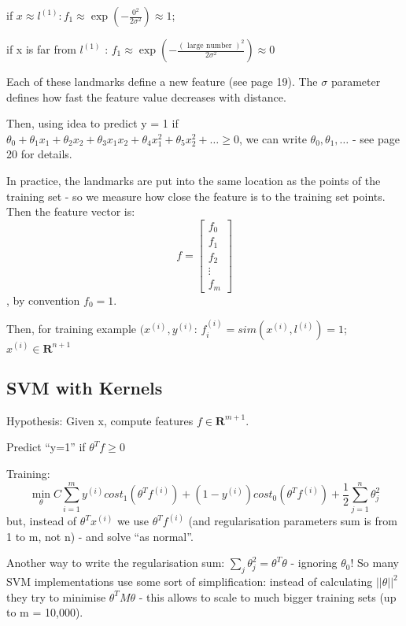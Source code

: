 \documentclass{scrartcl}
\begin{document}
if $x\approx l^{(1)} : f_1 \approx \exp(-\frac{0^2}{2\sigma^2})
\approx 1 $;

if x is far from $l^{(1)}$ : $f_1 \approx \exp(-\frac{(\textrm{ large
    number })^2}{2\sigma^2}) \approx 0$

Each of these landmarks define a new feature (see page 19). The
$\sigma$ parameter defines how fast the feature value decreases with
distance.

Then, using idea to predict y = 1 if $\theta_0 + \theta_1x_1 +
\theta_2x_2 + \theta_3x_1x_2 + \theta_4x_1^2 + \theta_5x_2^2 + \dots
\geq 0$, we can write $\theta_0, \theta_1, \dots$ - see page 20 for
details.
\label{12-5}

In practice, the landmarks are put into the same location as the
points of the training set - so we measure how close the feature is to
the training set points. Then the feature vector is: \[ f = \left[
  \begin{array}{l} f_0 \\ f_1 \\ f_2 \\ \vdots \\ f_m \end{array}
\right] \], by convention $f_0 = 1$.

Then, for training example $(x^{(i)}, y^{(i)}$: $f_i^{(i)} =
sim(x^{(i)}, l^{(i)}) = 1$; $x^{(i)} \in \mathbf{R}^{n+1}$

\subsection{SVM with Kernels}
\label{sec:12-5-1}

Hypothesis: Given x, compute features $f \in \mathbf{R}^{m+1}$.

Predict ``y=1'' if $\theta^T f \geq 0$

Training:
\[ \min \limits_{\theta} C \sum \limits_{i=1}^{m} y^{(i)}
cost_1(\theta^T f^{(i)}) + (1 - y^{(i)})cost_0(\theta^T f^{(i)}) +
\frac{1}{2}\sum \limits_{j=1}^{n}\theta_j^2 \] but, instead of
$\theta^Tx^{(i)}$ we use $\theta^Tf^{(i)}$ (and regularisation
parameters sum is from 1 to m, not n) - and solve ``as normal''.

Another way to write the regularisation sum: $\sum \limits_{j}
\theta_j^2 = \theta^T \theta$ - ignoring $\theta_0$! So many SVM
implementations use some sort of simplification: instead of
calculating $||\theta||^2$ they try to minimise $\theta^T M \theta$ -
this allows to scale to much bigger training sets (up to m = 10,000).
\end{document}
